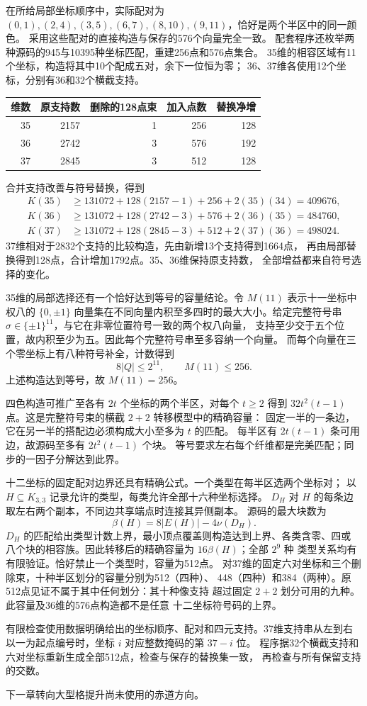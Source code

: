在所给局部坐标顺序中，实际配对为
$(0,1),(2,4),(3,5),(6,7),(8,10),(9,11)$，恰好是两个半区中的同一颜色。
采用这些配对的直接构造与保存的576个向量完全一致。
配套程序还枚举两种源码的945与10395种坐标匹配，重建256点和576点集合。
35维的相容区域有11个坐标，构造将其中10个配成五对，余下一位恒为零；
36、37维各使用12个坐标，分别有36和32个横截支持。
\begin{center}
\begin{minipage}{\linewidth}\centering
{}
\label{tab:signed-replacements}
\begin{tabular}{rrrrr}
\toprule
维数 & 原支持数 & 删除的128点束 & 加入点数 & 替换净增\\
\midrule
35&2157&1&256&128\\
36&2742&3&576&192\\
37&2845&3&512&128\\
\bottomrule
\end{tabular}
\end{minipage}
\end{center}
合并支持改善与符号替换，得到
\begin{align*}
K(35)&\ge131072+128(2157-1)+256+2(35)(34)=409676,\\
K(36)&\ge131072+128(2742-3)+576+2(36)(35)=484760,\\
K(37)&\ge131072+128(2845-3)+512+2(37)(36)=498024.
\end{align*}
37维相对于2832个支持的比较构造，先由新增13个支持得到1664点，
再由局部替换得到128点，合计增加1792点。35、36维保持原支持数，
全部增益都来自符号选择的变化。

35维的局部选择还有一个恰好达到等号的容量结论。令 $M(11)$ 表示十一坐标中
权八的 $\{0,\pm1\}$ 向量集在不同向量内积至多四时的最大大小。给定完整符号串
$\sigma\in\{\pm1\}^{11}$，与它在非零位置符号一致的两个权八向量，
支持至少交于五个位置，故内积至少为五。因此每个完整符号串至多容纳一个向量。
而每个向量在三个零坐标上有八种符号补全，计数得到
\[
8|Q|\le2^{11},\qquad M(11)\le256.
\]
上述构造达到等号，故 $M(11)=256$。

四色构造可推广至各有 $2t$ 个坐标的两个半区，对每个 $t\ge2$ 得到
$32t^2(t-1)$ 点。这是完整符号束的横截 $2+2$ 转移模型中的精确容量：
固定一半的一条边，它在另一半的搭配边必须构成大小至多为 $t$ 的匹配。
每半区有 $2t(t-1)$ 条可用边，故源码至多有 $2t^2(t-1)$ 个块。
等号要求左右每个纤维都是完美匹配；同步的一因子分解达到此界。

十二坐标的固定配对边界还具有精确公式。一个类型在每半区选两个坐标对；
以 $H\subseteq K_{3,3}$ 记录允许的类型，每类允许全部十六种坐标选择。
$D_H$ 对 $H$ 的每条边取左右两个副本，不同边共享端点时连接其异侧副本。
源码的最大块数为
\[
\beta(H)=8|E(H)|-4\nu(D_H).
\]
$D_H$ 的匹配给出类型计数上界，最小顶点覆盖则构造达到上界、各类含零、四或
八个块的相容族。因此转移后的精确容量为 $16\beta(H)$；全部 $2^9$ 种
类型关系均有有限验证。恰好禁止一个类型时，容量为512点。
对37维的固定六对坐标和三个删除束，十种半区划分的容量分别为512（四种）、
448（四种）和384（两种）。原512点见证不属于其中任何划分：其十种像支持
超过固定 $2+2$ 划分可用的九种。此容量及36维的576点构造都不是任意
十二坐标符号码的上界。

有限检查使用数据明确给出的坐标顺序、配对和四元支持。37维支持串从左到右
以一为起点编号时，坐标 $i$ 对应整数掩码的第 $37-i$ 位。
程序据32个横截支持和六对坐标重新生成全部512点，检查与保存的替换集一致，
再检查与所有保留支持的交数。

下一章转向大型格提升尚未使用的赤道方向。
